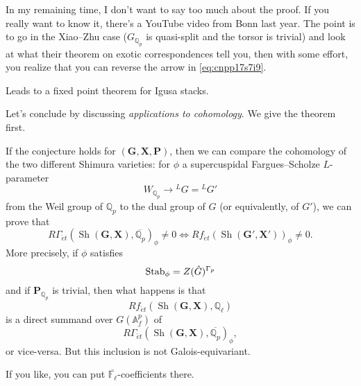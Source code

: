 \documentclass[reqno]{amsart} 
\begin{document}
In my remaining time, I don't want to say too much about the proof.  If you really want to know it, there's a YouTube video from Bonn last year.  The point is to go in the Xiao--Zhu case ($G_{\mathbb{Q}_p}$ is quasi-split and the torsor is trivial) and look at what their theorem on exotic correspondences tell you, then with some effort, you realize that you can reverse the arrow in \eqref{eq:cnpp17s7i9}.

Leads to a fixed point theorem for Igusa stacks.

Let's conclude by discussing \emph{applications to cohomology}.  We give the theorem first.
\begin{theorem}[vH--Sempliner]
  If the conjecture holds for $(\mathbf{G}, \mathbf{X}, \mathbf{P})$, then we can compare the cohomology of the two different Shimura varieties: for $\phi$ a supercuspidal Fargues--Scholze $L$-parameter
  \begin{equation*}
    W_{\mathbb{Q}_p} \rightarrow {}^L G = {}^L G'
  \end{equation*}
  from the Weil group of $\mathbb{Q}_p$ to the dual group of $G$ (or equivalently, of $G'$), we can prove that
  \begin{equation*}
    R \Gamma_{\acute{e}t}(\operatorname{Sh}(\mathbf{G}, \mathbf{X}), \overline{\mathbb{Q}_p})_{\phi}
    \neq 0 \iff
    R f_{\acute{e}t}(\operatorname{Sh}(\mathbf{G} ', \mathbf{X} '))_{\phi} \neq 0.
  \end{equation*}
  More precisely, if $\phi$ satisfies
  \begin{equation*}
    \operatorname{Stab}_\phi = Z(\hat{G})^{\Gamma_p}
  \end{equation*}
  and if $\mathbf{P}_{\mathbb{Q}_p}$ is trivial, then what happens is that
  \begin{equation*}
    R f_{\acute{e}t}(\operatorname{Sh}(\mathbf{G}, \mathbf{X}), \mathbb{Q}_{\ell})
  \end{equation*}
  is a direct summand over $G(\mathbb{A}_f^p)$ of
  \begin{equation*}
    R \Gamma_{\acute{e}t}(\operatorname{Sh}(\mathbf{G}, \mathbf{X}), \overline{\mathbb{Q}_p})_{\phi},
  \end{equation*}
  or vice-versa.  But this inclusion is not Galois-equivariant.  

  If you like, you can put $\overline{\mathbb{F}_{\ell}}$-coefficients there.  
\end{theorem}
\end{document}
